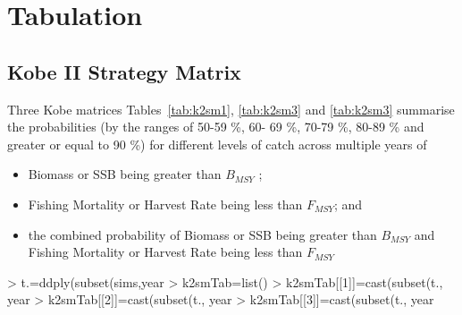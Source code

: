 \documentclass[shortnames,nojss,article]{jss}
\begin{document}
\clearpage
\section{Tabulation}

\subsection{Kobe II Strategy Matrix}

Three Kobe matrices Tables~\ref{tab:k2sm1}, \ref{tab:k2sm3} and \ref{tab:k2sm3} summarise the probabilities (by the ranges 
of 50-59 \%, 60- 69 \%, 70-79 \%, 80-89 \% and greater or equal to 90 \%) for different levels of catch across multiple years of 

\begin{itemize}
 \item  Biomass or SSB being greater than $B_{MSY}$ ;
 \item  Fishing Mortality or Harvest Rate being less than $F_{MSY}$; and 
 \item  the combined probability of Biomass or SSB being greater than $B_{MSY}$ and Fishing Mortality or Harvest Rate being less than $F_{MSY}$ 
\end{itemize}


\begin{Schunk}
\begin{Sinput}
> t.=ddply(subset(sims,year %
> k2smTab=list()
> k2smTab[[1]]=cast(subset(t., year %
> k2smTab[[2]]=cast(subset(t., year %
> k2smTab[[3]]=cast(subset(t., year %
\end{Sinput}
\end{Schunk}
\end{document}
